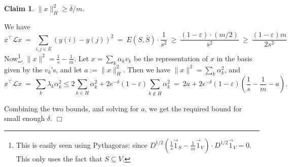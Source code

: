 \documentclass[11pt]{article}
\newtheorem{claim}[theorem]{Claim}
\newenvironment{myproof}{\noindent {\sc Proof:}}{$\Box$}
\def\epsilon{\varepsilon}
\def\lap{{\mathcal L}}
\def\Dhalf{D^{1/2}}
\begin{document}
\begin{claim} \label{clm:hnorm-x} $\|x\|_H^2 \geq \delta/m$.
\end{claim}

\begin{myproof} We have
$$x^\top \lap x\ =\ \sum_{i,j \in E} (y(i) - y(j))^2\ =\ E(S, \bar{S}) \cdot \frac{1}{s^2}\ \geq\ \frac{(1-\epsilon)\cdot (m/2)}{s^2}\ \geq\
\frac{(1-\epsilon)m}{2s^2}$$ Now\footnote{This is easily seen using Pythagoras: since $\Dhalf
(\frac{1}{s}\vec{1}_S - \frac{1}{m}\vec{1}_V) \cdot \Dhalf \vec{1}_V = 0$. This
only uses the fact that $S \subseteq V$.},
$\|x\|^2 = \frac{1}{s} - \frac{1}{m}$.
Let $x = \sum_k \alpha_k v_k$ be the
representation of $x$ in the basis given by the $v_k$'s, and let $a :=
\|x\|_H^2$. Then we have $\|x\|^2 = \sum_k \alpha_k^2$, and
$$x^\top \lap x\ =\ \sum_k \lambda_k \alpha_k^2 \leq 2\sum_{k \in H} \alpha_k^2 +
2e^{-\delta}(1-\epsilon)\sum_{k \notin H} \alpha_k^2\ =\ 2a +
2e^{-\delta}(1-\epsilon)\left(\frac{1}{s} - \frac{1}{m} - a\right).$$

Combining the two bounds, and solving for $a$, we get the required bound for small enough $\delta$.
\end{myproof}
\end{document}
